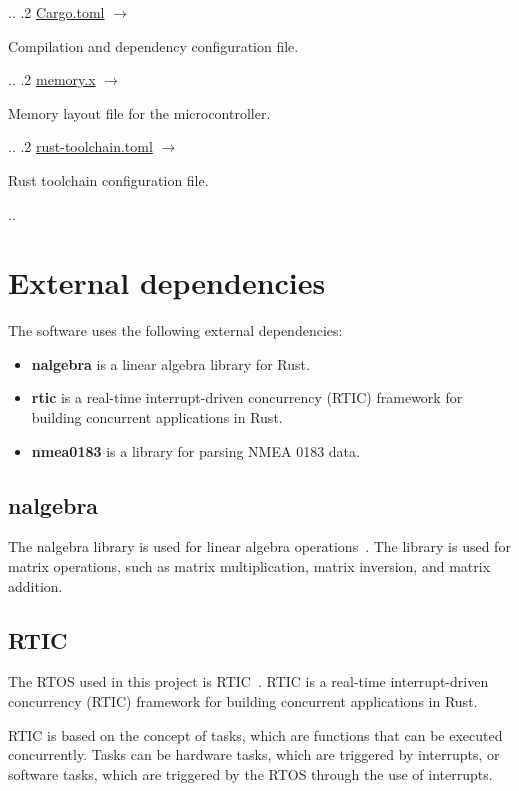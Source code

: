 {\begin{minipage}[t]{7cm}
    \end{minipage}..
    .2 \href{https://github.com/JensMoeslund/gps-miniprojekt/blob/master/Cargo.toml}{Cargo.toml} $\longrightarrow$
    \begin{minipage}[t]{7cm}
        Compilation and dependency configuration file{.}
    \end{minipage}..
    .2 \href{https://github.com/JensMoeslund/gps-miniprojekt/blob/master/memory.x}{memory.x} $\longrightarrow$
    \begin{minipage}[t]{7cm}
        Memory layout file for the microcontroller{.}
    \end{minipage}..
    .2 \href{https://github.com/JensMoeslund/gps-miniprojekt/blob/master/rust-toolchain.toml}{rust-toolchain.toml} $\longrightarrow$
    \begin{minipage}[t]{7cm}
        Rust toolchain configuration file{.}
    \end{minipage}..
}

\section{External dependencies}\label{sec:external-dependencies}
The software uses the following external dependencies:
\begin{itemize}
    \item \textbf{nalgebra} is a linear algebra library for Rust.
    \item \textbf{rtic} is a real-time interrupt-driven concurrency (RTIC) framework for building concurrent applications in Rust.
    \item \textbf{nmea0183} is a library for parsing NMEA 0183 data.
\end{itemize}
\subsection{nalgebra}
The nalgebra library is used for linear algebra operations~\cite{nalgebra}.
The library is used for matrix operations, such as matrix multiplication, matrix inversion, and matrix addition.

\subsection{RTIC}
The RTOS used in this project is RTIC~\cite{rtic}.
RTIC is a real-time interrupt-driven concurrency (RTIC) framework for building concurrent applications in Rust.

RTIC is based on the concept of tasks, which are functions that can be executed concurrently.
Tasks can be hardware tasks, which are triggered by interrupts, or software tasks, which are triggered by the RTOS through the use of interrupts.

